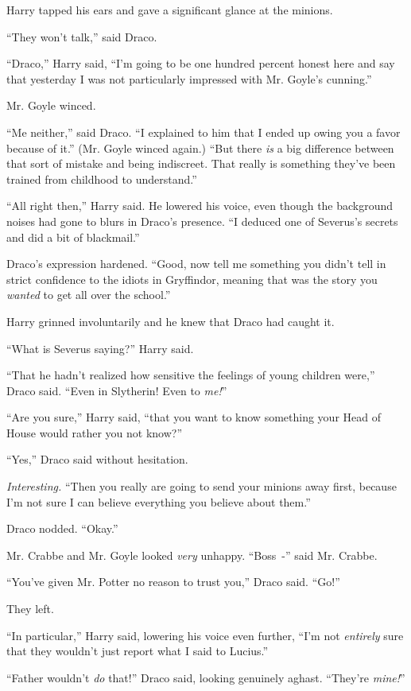 Harry tapped his ears and gave a significant glance at the minions.

``They won't talk,'' said Draco.

``Draco,'' Harry said, ``I'm going to be one hundred percent honest here and say that yesterday I was not particularly impressed with Mr. Goyle's cunning.''

Mr. Goyle winced.

``Me neither,'' said Draco. ``I explained to him that I ended up owing you a favor because of it.'' (Mr. Goyle winced again.) ``But there \emph{is} a big difference between that sort of mistake and being indiscreet. That really is something they've been trained from childhood to understand.''

``All right then,'' Harry said. He lowered his voice, even though the background noises had gone to blurs in Draco's presence. ``I deduced one of Severus's secrets and did a bit of blackmail.''

Draco's expression hardened. ``Good, now tell me something you didn't tell in strict confidence to the idiots in Gryffindor, meaning that was the story you \emph{wanted} to get all over the school.''

Harry grinned involuntarily and he knew that Draco had caught it.

``What is Severus saying?'' Harry said.

``That he hadn't realized how sensitive the feelings of young children were,'' Draco said. ``Even in Slytherin! Even to \emph{me!}''

``Are you sure,'' Harry said, ``that you want to know something your Head of House would rather you not know?''

``Yes,'' Draco said without hesitation.

\emph{Interesting.} ``Then you really are going to send your minions away first, because I'm not sure I can believe everything you believe about them.''

Draco nodded. ``Okay.''

Mr. Crabbe and Mr. Goyle looked \emph{very} unhappy. ``Boss~-'' said Mr. Crabbe.

``You've given Mr. Potter no reason to trust you,'' Draco said. ``Go!''

They left.

``In particular,'' Harry said, lowering his voice even further, ``I'm not \emph{entirely} sure that they wouldn't just report what I said to Lucius.''

``Father wouldn't \emph{do} that!'' Draco said, looking genuinely aghast. ``They're \emph{mine!}''

